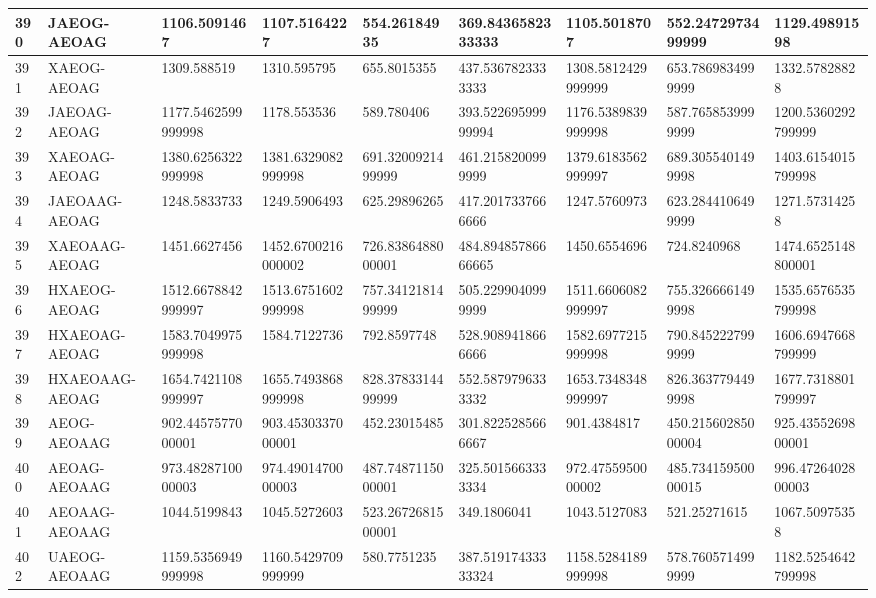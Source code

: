 {\begin{longtable}{|l|l|l|l|l|l|l|l|l|}
        390 & JAEOG-AEOAG & 1106.5091467 & 1107.5164227 & 554.26184935 & 369.8436582333333 & 1105.5018707 & 552.2472973499999 & 1129.49891598 \\ \hline
        391 & XAEOG-AEOAG & 1309.588519 & 1310.595795 & 655.8015355 & 437.5367823333333 & 1308.5812429999999 & 653.7869834999999 & 1332.57828828 \\ \hline
        392 & JAEOAG-AEOAG & 1177.5462599999998 & 1178.553536 & 589.780406 & 393.52269599999994 & 1176.5389839999998 & 587.7658539999999 & 1200.5360292799999 \\ \hline
        393 & XAEOAG-AEOAG & 1380.6256322999998 & 1381.6329082999998 & 691.3200921499999 & 461.2158200999999 & 1379.6183562999997 & 689.3055401499998 & 1403.6154015799998 \\ \hline
        394 & JAEOAAG-AEOAG & 1248.5833733 & 1249.5906493 & 625.29896265 & 417.2017337666666 & 1247.5760973 & 623.2844106499999 & 1271.57314258 \\ \hline
        395 & XAEOAAG-AEOAG & 1451.6627456 & 1452.6700216000002 & 726.8386488000001 & 484.89485786666665 & 1450.6554696 & 724.8240968 & 1474.6525148800001 \\ \hline
        396 & HXAEOG-AEOAG & 1512.6678842999997 & 1513.6751602999998 & 757.3412181499999 & 505.2299040999999 & 1511.6606082999997 & 755.3266661499998 & 1535.6576535799998 \\ \hline
        397 & HXAEOAG-AEOAG & 1583.7049975999998 & 1584.7122736 & 792.8597748 & 528.9089418666666 & 1582.6977215999998 & 790.8452227999999 & 1606.6947668799999 \\ \hline
        398 & HXAEOAAG-AEOAG & 1654.7421108999997 & 1655.7493868999998 & 828.3783314499999 & 552.5879796333332 & 1653.7348348999997 & 826.3637794499998 & 1677.7318801799997 \\ \hline
        399 & AEOG-AEOAAG & 902.4457577000001 & 903.4530337000001 & 452.23015485 & 301.8225285666667 & 901.4384817 & 450.21560285000004 & 925.4355269800001 \\ \hline
        400 & AEOAG-AEOAAG & 973.4828710000003 & 974.4901470000003 & 487.7487115000001 & 325.5015663333334 & 972.4755950000002 & 485.73415950000015 & 996.4726402800003 \\ \hline
        401 & AEOAAG-AEOAAG & 1044.5199843 & 1045.5272603 & 523.2672681500001 & 349.1806041 & 1043.5127083 & 521.25271615 & 1067.50975358 \\ \hline
        402 & UAEOG-AEOAAG & 1159.5356949999998 & 1160.5429709999999 & 580.7751235 & 387.51917433333324 & 1158.5284189999998 & 578.7605714999999 & 1182.5254642799998 \\ \hline

\end{longtable}}
